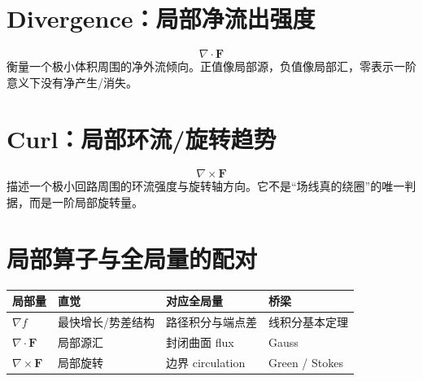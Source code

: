 \documentclass[11pt,a4paper,openany]{ctexbook}
\begin{document}
\section{Divergence：局部净流出强度}
\[
\nabla\cdot\bm F
\]
衡量一个极小体积周围的净外流倾向。正值像局部源，负值像局部汇，零表示一阶意义下没有净产生/消失。

\section{Curl：局部环流/旋转趋势}
\[
\nabla\times\bm F
\]
描述一个极小回路周围的环流强度与旋转轴方向。它不是“场线真的绕圈”的唯一判据，而是一阶局部旋转量。

\section{局部算子与全局量的配对}
\begin{longtable}{L{2.4cm}L{3.8cm}L{3.8cm}L{\dimexpr\linewidth-10.37cm\relax}}
\toprule
\textbf{局部量} & \textbf{直觉} & \textbf{对应全局量} & \textbf{桥梁}\\
\midrule
$\nabla f$ & 最快增长/势差结构 & 路径积分与端点差 & 线积分基本定理\\
$\nabla\cdot\bm F$ & 局部源汇 & 封闭曲面 flux & Gauss\\
$\nabla\times\bm F$ & 局部旋转 & 边界 circulation & Green / Stokes\\
\bottomrule
\end{longtable}
\end{document}
